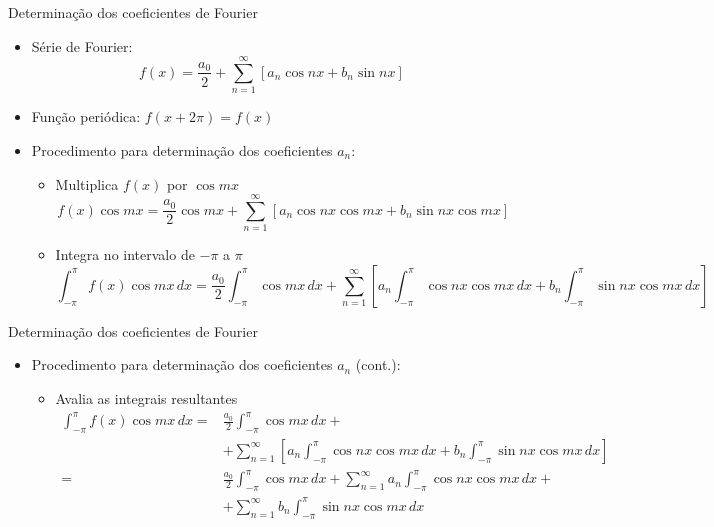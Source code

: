      \begin{slide}[toc=]{Determinação dos coeficientes de Fourier}
	      \begin{itemize}
		      \item Série de Fourier:
			      \begin{equation*}
				      f(x) = \frac{a_0}{2}+ \sum_{n=1}^\infty \left [ a_n\cos nx  + b_n\sin nx \right ]
			      \end{equation*}\pause	
		      \item Função periódica: $f(x+2\pi) = f(x)$\pause
		      \item Procedimento para determinação dos coeficientes $a_n$:\pause
			      \begin{itemize}
				      \item Multiplica $f(x)$ por $\cos mx$\pause
					      \begin{equation*}
						      f(x)\cos mx = \frac{a_0}{2}\cos mx+ \sum_{n=1}^\infty \left [ a_n\cos nx\cos mx  + b_n\sin nx\cos mx \right ]
					      \end{equation*}\pause	
				      \item Integra no intervalo de $-\pi$ a $\pi$\pause
					      \begin{equation*}
						      \int_{-\pi}^\pi f(x)\cos mx\, dx = \frac{a_0}{2}\int_{-\pi}^\pi\cos mx\, dx + \sum_{n=1}^\infty \left [a_n\int_{-\pi}^\pi \cos nx\cos mx\, dx + b_n\int_{-\pi}^\pi\sin nx\cos mx\, dx\right ]
					      \end{equation*}	
			      \end{itemize}
            \end{itemize}
      \end{slide}

     \begin{slide}[toc=]{Determinação dos coeficientes de Fourier}
	      \begin{itemize}
		      \item Procedimento para determinação dos coeficientes $a_n$ (cont.):
			      \begin{itemize}
				      \item Avalia as integrais resultantes
					      \begin{align*}
						      \int_{-\pi}^\pi f(x)\cos mx\, dx =& \frac{a_0}{2}\int_{-\pi}^\pi\cos mx\, dx + \\
						                                        &+\sum_{n=1}^\infty \left [a_n\int_{-\pi}^\pi \cos nx\cos mx\, dx + b_n\int_{-\pi}^\pi\sin nx\cos mx\, dx\right ]\\
						      =&\frac{a_0}{2}\int_{-\pi}^\pi\cos mx\, dx + \sum_{n=1}^\infty a_n\int_{-\pi}^\pi \cos nx\cos mx\, dx +\\
						      &+\sum_{n=1}^\infty b_n\int_{-\pi}^\pi \sin nx\cos mx\, dx
					      \end{align*}
			      \end{itemize}
            \end{itemize}
      \end{slide}

